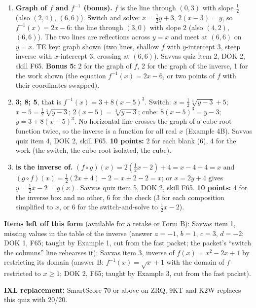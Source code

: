 \documentclass[11pt]{article}
\begin{document}
\begin{enumerate}
\item[\textbf{2.}] \textbf{Graph of $f$ and $f^{-1}$ (bonus).} $f$ is the line through $(0,3)$ with slope $\tfrac12$ (also $(2,4)$, $(6,6)$). Switch and solve: $x=\tfrac12y+3$, $2(x-3)=y$, so $f^{-1}(x)=2x-6$: the line through $(3,0)$ with slope $2$ (also $(4,2)$, $(6,6)$). The two lines are reflections across $y=x$ and meet at $(6,6)$ on $y=x$. TE key: graph shown (two lines, shallow $f$ with $y$-intercept 3, steep inverse with $x$-intercept 3, crossing at $(6,6)$). Savvas quiz item 2, DOK 2, skill F65. \textbf{Bonus 5:} 2 for the graph of $f$, 2 for the graph of the inverse, 1 for the work shown (the equation $f^{-1}(x)=2x-6$, or two points of $f$ with their coordinates swapped).
\item[\textbf{4.}] \textbf{3; 8; 5}, that is $f^{-1}(x)=3+8(x-5)^3$. Switch: $x=\tfrac12\sqrt[3]{y-3}+5$; $x-5=\tfrac12\sqrt[3]{y-3}$; $2(x-5)=\sqrt[3]{y-3}$; cube: $8(x-5)^3=y-3$; $y=3+8(x-5)^3$. No horizontal line crosses the graph of a cube-root function twice, so the inverse is a function for all real $x$ (Example 4B). Savvas quiz item 4, DOK 2, skill F65. \textbf{10 points:} 2 for each blank (6), 4 for the work (the switch, the cube root isolated, the cube).
\item[\textbf{5.}] \textbf{is the inverse of.} $(f\circ g)(x)=2(\tfrac12x-2)+4=x-4+4=x$ and $(g\circ f)(x)=\tfrac12(2x+4)-2=x+2-2=x$; or $x=2y+4$ gives $y=\tfrac12x-2=g(x)$. Savvas quiz item 5, DOK 2, skill F65. \textbf{10 points:} 4 for the inverse box and no other, 6 for the check (3 for each composition simplified to $x$, or 6 for the switch-and-solve to $\tfrac12x-2$).
\end{enumerate}

\textbf{Items left off this form} (available for a retake or Form B): Savvas item 1, missing values in the table of the inverse (answer $a=-1$, $b=1$, $c=3$, $d=-2$; DOK 1, F65; taught by Example 1, cut from the fast packet; the packet's ``switch the columns'' line rehearses it); Savvas item 3, inverse of $f(x)=x^2-2x+1$ by restricting its domain (answer B: $f^{-1}(x)=\sqrt{x}+1$ with the domain of $f$ restricted to $x\geq1$; DOK 2, F65; taught by Example 3, cut from the fast packet).

\textbf{IXL replacement:} SmartScore 70 or above on ZRQ, 9KT and K2W replaces this quiz with 20/20.
\end{document}
